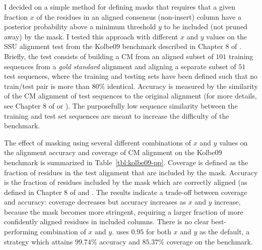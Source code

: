 I decided on a simple method for defining masks that requires that
a given fraction $x$ of the residues in an aligned consensus
(non-insert) column have a posterior probability above a minimum
threshold $y$ to be included (not pruned away) by the mask. I tested
this approach with different $x$ and $y$ values on 
the SSU alignment test from the Kolbe09 benchmark \cite{KolbeEddy09}
described in Chapter 8 of \cite{Nawrocki09b}. Briefly, the test consists of building a CM
from an aligned subset of $101$ training sequences from a \emph{gold
standard}  alignment and aligning a separate subset of $51$ test
sequences, where the training and testing sets have been defined such
that no train/test pair is more than 80\% identical. Accuracy is
measured by the similarity of the CM alignment of test sequences to
the original  alignment (for more details, see Chapter 8 of
\cite{Nawrocki09b} or
\cite{KolbeEddy09}). The purposefully low sequence similarity between
the training and test set sequences are meant to increase the
difficulty of the benchmark. 

The effect of masking using several different combinations of $x$ and
$y$ values on the alignment accuracy and coverage of CM alignment on
the Kolbe09 benchmark is summarized in
Table~\ref{tbl:kolbe09-pp}. Coverage is defined as the fraction of
residues in the test alignment that are included by the mask. Accuracy
is the fraction of residues included by the mask which are correctly
aligned (as defined in Chapter 8 of \cite{Nawrocki09b} and \cite{KolbeEddy09}. 
The results indicate a trade-off between 
coverage and accuracy: coverage decreases but accuracy increases
as $x$ and $y$ increase, because the mask becomes more stringent,
requiring a larger fraction of more confidently aligned residues in
included columns. There is no clear best-performing combination of $x$
and $y$.  uses $0.95$ for both $x$ and $y$ as the
default, a strategy which attains $99.74\%$ accuracy and $85.37\%$
coverage on the benchmark. 

